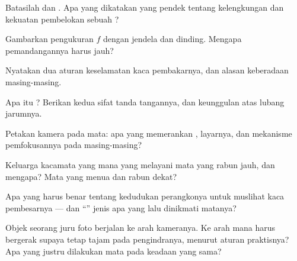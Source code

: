 \begin{exercise}[$\star$]\label{exo:g8:lenses-images:2}
Batasilah  dan . Apa yang dikatakan 
yang pendek tentang kelengkungan dan kekuatan pembelokan sebuah ?
\end{exercise}

\begin{exercise}[$\star$]\label{exo:g8:lenses-images:3}
Gambarkan pengukuran $f$ dengan jendela dan dinding. Mengapa
pemandangannya harus jauh?
\end{exercise}

\begin{exercise}[$\star$]\label{exo:g8:lenses-images:4}
Nyatakan dua aturan keselamatan kaca pembakarnya, dan alasan
keberadaan masing-masing.
\end{exercise}

\begin{exercise}[$\star$]\label{exo:g8:lenses-images:5}
Apa itu ? Berikan kedua sifat tanda tangannya, dan
keunggulan  atas lubang jarumnya.
\end{exercise}

\begin{exercise}[$\star$]\label{exo:g8:lenses-images:6}
Petakan kamera pada mata: apa yang memerankan , layarnya, dan
mekanisme pemfokusannya pada masing-masing?
\end{exercise}

\begin{exercise}[$\star$]\label{exo:g8:lenses-images:7}
Keluarga kacamata yang mana yang melayani mata yang rabun jauh, dan
mengapa? Mata yang menua dan rabun dekat?
\end{exercise}

\begin{exercise}[$\star$]\label{exo:g8:lenses-images:8}
Apa yang harus benar tentang kedudukan perangkonya untuk muslihat kaca
pembesarnya --- dan ``'' jenis apa yang lalu dinikmati matanya?
\end{exercise}

\begin{exercise}[$\star\star$]\label{exo:g8:lenses-images:9}
Objek seorang juru foto berjalan ke arah kameranya. Ke arah mana
 harus bergerak supaya  tetap tajam pada
pengindranya, menurut aturan praktisnya? Apa yang justru dilakukan
mata pada keadaan yang sama?
\end{exercise}

